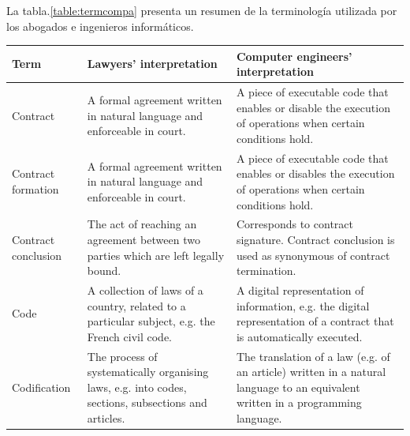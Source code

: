 \documentclass[12pt]{report} %
\begin{document}
La tabla.\ref{table:termcompa} presenta un resumen de la terminología utilizada por los abogados e ingenieros informáticos.


\begin{table}
 \begin{center}
  {\scriptsize
 \begin{tabular}{|K|Q|Q|} %

 \hline  
 
  Term
   &   Lawyers' interpretation
   &    Computer engineers' interpretation \\
     \hline \hline
    
 Contract
    & A formal agreement written in natural language
              and enforceable in court.  
   & A piece of executable code that enables
              or disable the execution of operations
              when certain conditions hold.  \\
     \hline
  
 Contract formation
   & A formal agreement written in natural language
              and enforceable in court.
              
  & A piece of executable code that enables
              or disables the execution of operations
              when certain conditions hold.  \\
     \hline

  
 Contract conclusion
  & The act of reaching an agreement between two
     parties which are left legally bound.
              
  & Corresponds to contract signature. Contract conclusion
    is used as synonymous of contract termination.\\
     \hline


Code
  &  A collection of laws of a country, related to a particular 
     subject, e.g. the French civil code.
  & A digital representation of information, e.g.
    the digital representation of a contract that is
    automatically executed.\\
     \hline
     
  Codification
  &  The process of systematically organising laws, e.g.
     into codes, sections, subsections and articles.
  &  The translation of a law (e.g. of an article)
     written in a natural language to
    an equivalent written in a programming language.\\
     \hline
 

\end{tabular}}
\end{center}
\end{table}
\end{document}
